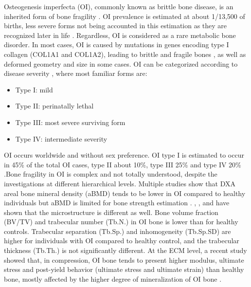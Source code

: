 \documentclass[a4paper,fleqn]{DC_ArtStyle}
\begin{document}
	Osteogenesis imperfecta (OI), commonly known as brittle bone disease, is an inherited form of bone fragility \cite{Tournis2018}. OI prevalence is estimated at about  1/13,500 of births, less severe forms not being accounted in this estimation as they are recognized later in life \cite{Lindahl2015}. Regardless, OI is considered as a rare metabolic bone disorder. In most cases, OI is caused by mutations in genes encoding type I collagen (COL1A1 and COL1A2), leading to brittle and fragile bones \cite{LIM2017}, as well as deformed geometry and size in some cases. OI can be categorized according to disease severity \cite{Mortier2019}, where most familiar forms are:
	\begin{itemize}
		\item Type I: mild
		\item Type II: perinatally lethal
		\item Type III: most severe surviving form
		\item Type IV: intermediate severity
	\end{itemize}
	
	OI occurs worldwide and without sex preference. OI type I is estimated to occur in 45\% of the total OI cases, type II about 10\%, type III 25\% and type IV 20\% \cite{Martin2007}.Bone fragility in OI is complex and not totally understood, despite the investigations at different hierarchical levels. Multiple studies show that DXA areal bone mineral density (aBMD) tends to be lower in OI compared to healthy individuals \cite{Folkestad2012,Lindahl2015,Scheres2018} but aBMD is limited for bone strength estimation \cite{Pasco2006}.  \citeauthor{Folkestad2012}\cite{Folkestad2012}, \citeauthor{Kocijan2015}\cite{Kocijan2015}, and \citeauthor{Rolvien2018}\cite{Rolvien2018} have shown that the microstructure is different as well. Bone volume fraction (BV/TV) and trabecular number (Tb.N.) in OI bone is lower than for healthy controls. Trabecular separation (Tb.Sp.) and inhomogeneity (Tb.Sp.SD) are higher for individuals with OI compared to healthy control, and the trabecular thickness (Tb.Th.) is not significantly different. At the ECM level, a recent study showed that, in compression, OI bone tends to present higher modulus, ultimate stress and post-yield behavior (ultimate stress and ultimate strain) than healthy bone, mostly affected by the higher degree of mineralization of OI bone \cite{Indermaur2021}.\\
	
\end{document}
